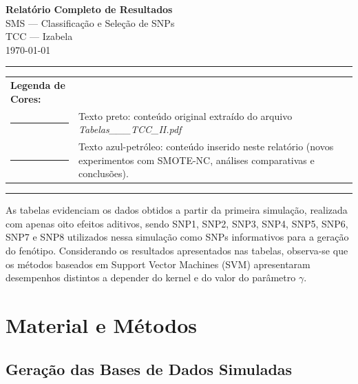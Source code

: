 \documentclass[12pt,a4paper]{article}
\newcommand{\novo}[1]{\textcolor{corNova}{#1}}
\begin{document}
\begin{center}
  {\LARGE\bfseries Relatório Completo de Resultados}\\[0.4em]
  {\large SMS --- Classificação e Seleção de SNPs}\\[0.3em]
  {\large TCC --- Izabela}\\[0.5em]
  \today
\end{center}

\noindent\rule{\textwidth}{0.6pt}
\vspace{0.3em}

\begin{center}
\begin{tabular}{@{}lp{13cm}@{}}
  \textbf{Legenda de Cores:} & \\[2pt]
  \textcolor{black}{\rule{1.2cm}{5pt}} &
    Texto preto: conteúdo original extraído do arquivo
    \textit{Tabelas\_\_\_TCC\_II.pdf} \\[4pt]
  \textcolor{corNova}{\rule{1.2cm}{5pt}} &
    \novo{Texto azul-petróleo: conteúdo inserido neste relatório
    (novos experimentos com SMOTE-NC, análises comparativas e conclusões).} \\
\end{tabular}
\end{center}

\noindent\rule{\textwidth}{0.6pt}
\vspace{0.5em}

As tabelas evidenciam os dados obtidos a partir da primeira simulação, realizada com apenas oito efeitos aditivos, sendo SNP1, SNP2, SNP3, SNP4, SNP5, SNP6, SNP7 e SNP8 utilizados nessa simulação como SNPs informativos para a geração do fenótipo. Considerando os resultados apresentados nas tabelas, observa-se que os métodos baseados em Support Vector Machines (SVM) apresentaram desempenhos distintos a depender do kernel e do valor do parâmetro $\gamma$.

\section*{\novo{Material e Métodos}}

\subsection*{\novo{Geração das Bases de Dados Simuladas}}
\end{document}
